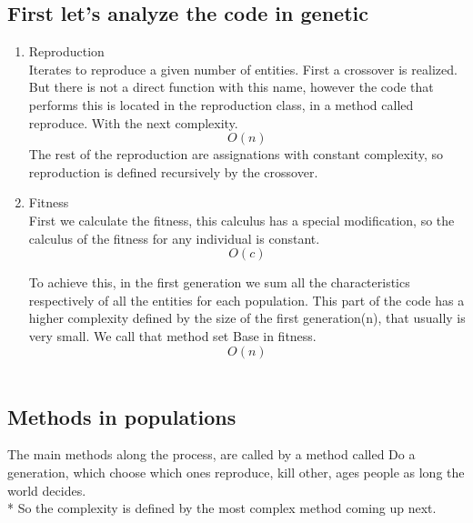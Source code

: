 \documentclass[twocolumn]{IEEEtran}
\begin{document}
\subsection{First let's analyze the code in genetic} 
\begin{enumerate}

	\item Reproduction\\
    Iterates to reproduce a given number of entities. 
    First a crossover is realized. But there is not a direct function with this name, however the code that performs this is located in the reproduction class, in a method called reproduce. With the next complexity.  
    \begin{equation} O(n) \end{equation}
    The rest of the reproduction are assignations with constant complexity, so reproduction is defined recursively by the crossover.

	\item Fitness\\
	First we calculate the fitness, this calculus has a special modification, so the calculus of the fitness for any individual is constant. 
    \begin{equation} O(c) \end{equation}
    
    To achieve this, in the first generation we sum all the characteristics respectively of all the entities for each population. This part of the code has a higher complexity defined by the size of the first generation(n), that usually is very small. We call that method set Base in fitness.
    \begin{equation} O(n) \end{equation}\\
    
\end{enumerate}

\subsection{Methods in populations}
	The main methods along the process, are called by a method called Do a generation, which choose which ones reproduce, kill other, ages people as long the world decides.\\*
    So the complexity is defined by the most complex method coming up next.\\
\end{document}
